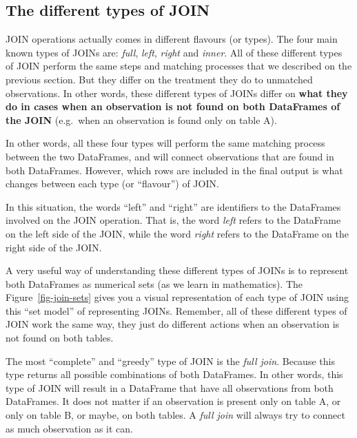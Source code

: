 \documentclass[
  11pt,
  letterpaper,
  DIV=11,
  numbers=noendperiod]{scrreprt}
\begin{document}
\hypertarget{the-different-types-of-join}{%
\subsection{The different types of
JOIN}\label{the-different-types-of-join}}

JOIN operations actually comes in different flavours (or types). The
four main known types of JOINs are: \emph{full}, \emph{left},
\emph{right} and \emph{inner}. All of these different types of JOIN
perform the same steps and matching processes that we described on the
previous section. But they differ on the treatment they do to unmatched
observations. In other words, these different types of JOINs differ on
\textbf{what they do in cases when an observation is not found on both
DataFrames of the JOIN} (e.g.~when an observation is found only on table
A).

In other words, all these four types will perform the same matching
process between the two DataFrames, and will connect observations that
are found in both DataFrames. However, which rows are included in the
final output is what changes between each type (or ``flavour'') of JOIN.

In this situation, the words ``left'' and ``right'' are identifiers to
the DataFrames involved on the JOIN operation. That is, the word
\emph{left} refers to the DataFrame on the left side of the JOIN, while
the word \emph{right} refers to the DataFrame on the right side of the
JOIN.

A very useful way of understanding these different types of JOINs is to
represent both DataFrames as numerical sets (as we learn in
mathematics). The Figure~\ref{fig-join-sets} gives you a visual
representation of each type of JOIN using this ``set model'' of
representing JOINs. Remember, all of these different types of JOIN work
the same way, they just do different actions when an observation is not
found on both tables.

The most ``complete'' and ``greedy'' type of JOIN is the \emph{full
join}. Because this type returns all possible combinations of both
DataFrames. In other words, this type of JOIN will result in a DataFrame
that have all observations from both DataFrames. It does not matter if
an observation is present only on table A, or only on table B, or maybe,
on both tables. A \emph{full join} will always try to connect as much
observation as it can.
\end{document}
